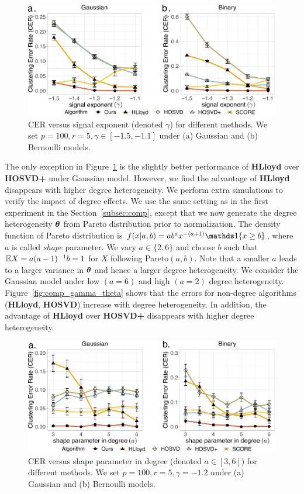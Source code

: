 \documentclass[journal]{IEEEtran}
\theoremstyle{definition}
\theoremstyle{definition}
\begin{document}
\begin{figure}[h!]
    \centering
    \includegraphics[width=\columnwidth]{comp_gamma_anno3.pdf}
    \caption{CER versus signal exponent (denoted $\gamma$) for different methods. We set $p = 100, r = 5, \gamma \in [-1.5, -1.1]$ under (a) Gaussian and (b) Bernoulli models.}
    \label{fig:comp_gamma}
\end{figure}

The only exception in Figure~\ref{fig:comp_gamma} is the slightly better performance of \textbf{\small HLloyd} over \textbf{\small HOSVD+} under Gaussian model. However, we find the advantage of \textbf{\small HLloyd} disappears with higher degree heterogeneity. We perform extra simulations to verify the impact of degree effects. We use the same setting as in the first experiment in the Section~\ref{subsec:comp}, except that we now generate the degree heterogeneity $\boldsymbol{\theta}$ from Pareto distribution prior to normalization. The density function of Pareto distribution is $f(x|a,b) = a b^a x^{-(a+1)} \ind\{ x \geq b \}$, where $a$ is called \emph{shape} parameter. We vary $a \in \{2,6\}$ and choose $b$ such that $\mathbb{E} X = a(a - 1)^{-1}b = 1$ for $X$ following Pareto$(a,b)$. Note that a smaller $a$ leads to a larger variance in $\boldsymbol{\theta}$ and hence a larger degree heterogeneity. We consider the Gaussian model under low $(a = 6)$ and high $(a = 2)$ degree heterogeneity. Figure~\ref{fig:comp_gamma_theta} shows that the errors for non-degree algorithms (\textbf{\small HLloyd}, \textbf{\small HOSVD}) increase with degree heterogeneity. In addition, the advantage of \textbf{\small HLloyd} over \textbf{\small HOSVD+} disappears with higher degree heterogeneity. 

\begin{figure}[h!]
    \centering
    \includegraphics[width=\columnwidth]{comp_theta_anno3.pdf}
    \caption{CER versus shape parameter in degree (denoted $a\in[3,6]$) for different methods. We set $p = 100, r = 5, \gamma = -1.2$ under (a) Gaussian and (b) Bernoulli models.}
    \label{fig:comp_theta}
\end{figure}
\end{document}
